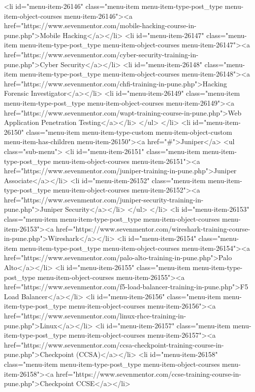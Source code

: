 {<li id="menu-item-26146" class="menu-item menu-item-type-post_type menu-item-object-courses menu-item-26146"><a href="https://www.sevenmentor.com/mobile-hacking-course-in-pune.php">Mobile Hacking</a></li>
<li id="menu-item-26147" class="menu-item menu-item-type-post_type menu-item-object-courses menu-item-26147"><a href="https://www.sevenmentor.com/cyber-security-training-in-pune.php">Cyber Security</a></li>
<li id="menu-item-26148" class="menu-item menu-item-type-post_type menu-item-object-courses menu-item-26148"><a href="https://www.sevenmentor.com/chfi-training-in-pune.php">Hacking Forensic Investigator</a></li>
<li id="menu-item-26149" class="menu-item menu-item-type-post_type menu-item-object-courses menu-item-26149"><a href="https://www.sevenmentor.com/wapt-training-course-in-pune.php">Web Application Penetration Testing</a></li>
</ul>
</li>
<li id="menu-item-26150" class="menu-item menu-item-type-custom menu-item-object-custom menu-item-has-children menu-item-26150"><a href="#">Juniper</a>
<ul class="sub-menu">
<li id="menu-item-26151" class="menu-item menu-item-type-post_type menu-item-object-courses menu-item-26151"><a href="https://www.sevenmentor.com/juniper-training-in-pune.php">Juniper Associate</a></li>
<li id="menu-item-26152" class="menu-item menu-item-type-post_type menu-item-object-courses menu-item-26152"><a href="https://www.sevenmentor.com/juniper-security-training-in-pune.php">Juniper Security</a></li>
</ul>
</li>
<li id="menu-item-26153" class="menu-item menu-item-type-post_type menu-item-object-courses menu-item-26153"><a href="https://www.sevenmentor.com/wireshark-training-course-in-pune.php">Wireshark</a></li>
<li id="menu-item-26154" class="menu-item menu-item-type-post_type menu-item-object-courses menu-item-26154"><a href="https://www.sevenmentor.com/palo-alto-training-in-pune.php">Palo Alto</a></li>
<li id="menu-item-26155" class="menu-item menu-item-type-post_type menu-item-object-courses menu-item-26155"><a href="https://www.sevenmentor.com/f5-load-balancer-training-in-pune.php">F5 Load Balancer</a></li>
<li id="menu-item-26156" class="menu-item menu-item-type-post_type menu-item-object-courses menu-item-26156"><a href="https://www.sevenmentor.com/linux-rhce-training-in-pune.php">Linux</a></li>
<li id="menu-item-26157" class="menu-item menu-item-type-post_type menu-item-object-courses menu-item-26157"><a href="https://www.sevenmentor.com/ccsa-checkpoint-training-course-in-pune.php">Checkpoint (CCSA)</a></li>
<li id="menu-item-26158" class="menu-item menu-item-type-post_type menu-item-object-courses menu-item-26158"><a href="https://www.sevenmentor.com/ccse-training-course-in-pune.php">Checkpoint CCSE</a></li>
}
